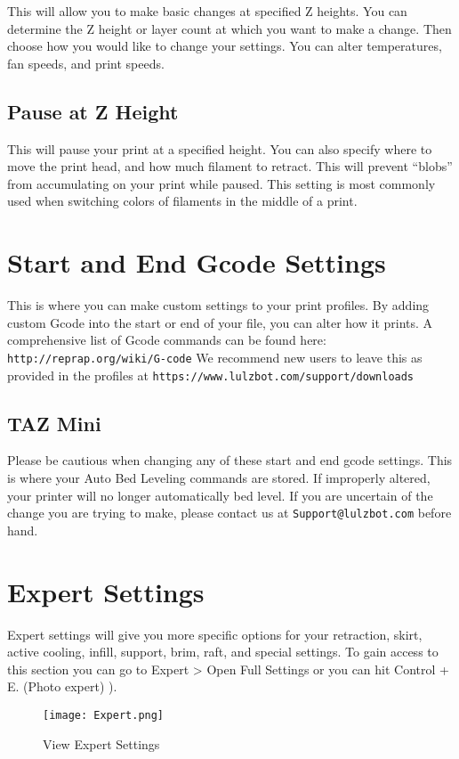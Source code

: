 This will allow you to make basic changes at specified Z heights. You can determine the Z height or layer count at which you want to make a change. Then choose how you would like to change your settings. You can alter temperatures, fan speeds, and print speeds.

\subsection{Pause at Z Height}

This will pause your print at a specified height. You can also specify where 	to move the print head, and how much filament to retract. This will prevent “blobs” from accumulating on your print while paused. This setting is most commonly used when switching colors of filaments in the middle of a print.

\section{Start and End Gcode Settings}

This is where you can make custom settings to your print profiles. By adding custom Gcode into the start or end of your file, you can alter how it prints. A comprehensive list of Gcode commands can be found here: \texttt{http://reprap.org/wiki/G-code} We recommend new users to leave this as provided in the profiles at \texttt{https://www.lulzbot.com/support/downloads}

\subsection{TAZ Mini}
Please be cautious when changing any of these start and end gcode settings. This is where your Auto Bed Leveling commands are stored. If improperly altered, your printer will no longer 	automatically bed level. If you are uncertain of the change you are trying to make, please contact us at \texttt{Support@lulzbot.com} before hand.

\section{Expert Settings}

Expert settings will give you more specific options for your retraction, skirt, active cooling, infill, support, brim, raft, and special settings. To gain access to this section you can go to Expert > Open Full Settings or you can hit Control + E. (Photo expert)
\pageref{fig:Expert Settings}).
\begin{figure}[hbt]
\centering
\texttt{[image: Expert.png]}
\caption{View Expert Settings}
\label{fig:Expert Settings}
\end{figure}

